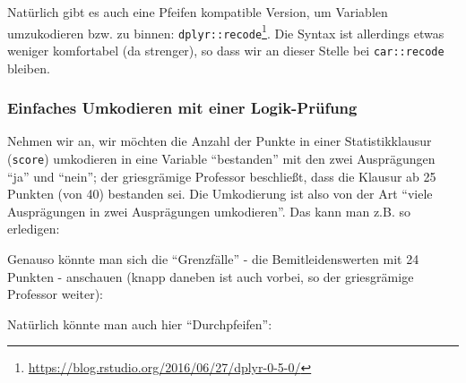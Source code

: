 \documentclass[12pt,ngerman,]{book}
\makeatletter
\newenvironment{Shaded}{\begin{snugshade}}{\end{snugshade}}
\newcommand{\KeywordTok}[1]{\textcolor[rgb]{0.13,0.29,0.53}{\textbf{{#1}}}}
\newcommand{\DataTypeTok}[1]{\textcolor[rgb]{0.13,0.29,0.53}{{#1}}}
\newcommand{\DecValTok}[1]{\textcolor[rgb]{0.00,0.00,0.81}{{#1}}}
\newcommand{\StringTok}[1]{\textcolor[rgb]{0.31,0.60,0.02}{{#1}}}
\newcommand{\CommentTok}[1]{\textcolor[rgb]{0.56,0.35,0.01}{\textit{{#1}}}}
\newcommand{\NormalTok}[1]{{#1}}
\let\rmarkdownfootnote\footnote%
\def\footnote{\protect\rmarkdownfootnote}
\newenvironment{kframe}{%
\medskip{}
\setlength{\fboxsep}{.8em}
 \def\at@end@of@kframe{}%
 \ifinner\ifhmode%
  \def\at@end@of@kframe{\end{minipage}}%
  \begin{minipage}{\columnwidth}%
 \fi\fi%
 \def\FrameCommand##1{\hskip\@totalleftmargin \hskip-\fboxsep
 \colorbox{shadecolor}{##1}\hskip-\fboxsep
     \hskip-\linewidth \hskip-\@totalleftmargin \hskip\columnwidth}%
 \MakeFramed {\advance\hsize-\width
   \@totalleftmargin\z@ \linewidth\hsize
   \@setminipage}}%
 {\par\unskip\endMakeFramed%
 \at@end@of@kframe}
\renewenvironment{Shaded}{\begin{kframe}}{\end{kframe}}
\theoremstyle{definition}
\theoremstyle{definition}
\theoremstyle{remark}
\makeatother
\begin{document}
Natürlich gibt es auch eine Pfeifen kompatible Version, um Variablen
umzukodieren bzw. zu binnen: \texttt{dplyr::recode}\footnote{\url{https://blog.rstudio.org/2016/06/27/dplyr-0-5-0/}}.
Die Syntax ist allerdings etwas weniger komfortabel (da strenger), so
dass wir an dieser Stelle bei \texttt{car::recode} bleiben.

\subsubsection{Einfaches Umkodieren mit einer
Logik-Prüfung}\label{einfaches-umkodieren-mit-einer-logik-prufung}

Nehmen wir an, wir möchten die Anzahl der Punkte in einer
Statistikklausur (\texttt{score}) umkodieren in eine Variable
``bestanden'' mit den zwei Ausprägungen ``ja'' und ``nein''; der
griesgrämige Professor beschließt, dass die Klausur ab 25 Punkten (von
40) bestanden sei. Die Umkodierung ist also von der Art ``viele
Ausprägungen in zwei Ausprägungen umkodieren''. Das kann man z.B. so
erledigen:

\begin{Shaded}
\end{Shaded}

Genauso könnte man sich die ``Grenzfälle'' - die Bemitleidenswerten mit
24 Punkten - anschauen (knapp daneben ist auch vorbei, so der
griesgrämige Professor weiter):

\begin{Shaded}
\end{Shaded}

Natürlich könnte man auch hier ``Durchpfeifen'':

\begin{Shaded}
\end{Shaded}
\end{document}
